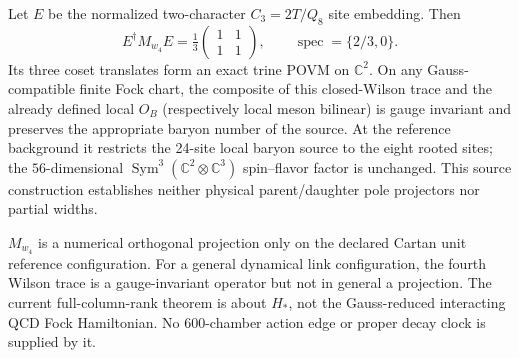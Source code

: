 \documentclass[12pt,a4paper]{article}
\begin{document}
\begin{proposition}
\label{p10:prop:v368-wilson-root-fock-source}
Let $E$ be the normalized two-character $C_3=2T/Q_8$
site embedding. Then
\[
 E^\dagger M_{w_4}E=\tfrac13\begin{pmatrix}1&1\\1&1\end{pmatrix},\qquad
 \operatorname{spec}=\{2/3,0\}.
\]
Its three coset translates form an exact trine POVM on $\mathbb C^2$.
On any Gauss-compatible finite Fock chart, the composite of this
closed-Wilson trace and the already defined local $O_B$ (respectively
local meson bilinear) is gauge invariant and preserves the appropriate
baryon number of the source. At the reference background it restricts
the 24-site local baryon source to the eight rooted sites; the
$56$-dimensional $\operatorname{Sym}^3(\mathbb C^2\otimes\mathbb C^3)$
spin--flavor factor is unchanged. This source construction establishes
neither physical parent/daughter pole projectors nor partial widths.
\end{proposition}
\begin{remark}
$M_{w_4}$ is a numerical orthogonal projection only on the declared
Cartan unit reference configuration. For a general dynamical link
configuration, the fourth Wilson trace is a gauge-invariant operator
but not in general a projection. The current full-column-rank theorem
is about $H_*$, not the Gauss-reduced interacting QCD Fock Hamiltonian.
No $600$-chamber action edge or proper decay clock is supplied by it.
\end{remark}
\end{document}
